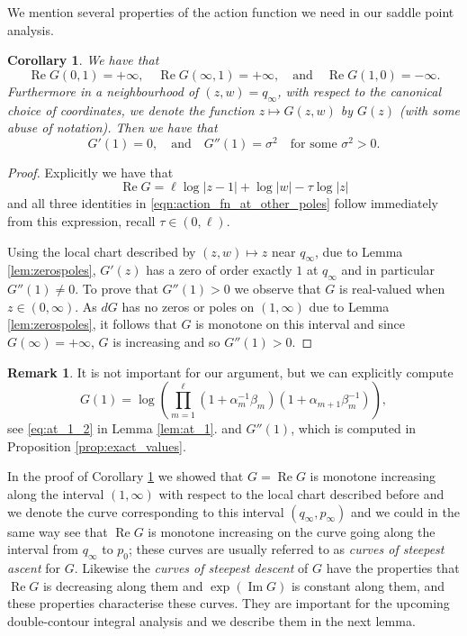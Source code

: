 \documentclass[11pt]{article}
\theoremstyle{plain}
\newtheorem{corollary}[theorem]{Corollary}
\theoremstyle{definition}
\newtheorem{remark}[theorem]{Remark}
\numberwithin{equation}{section}
\DeclareMathOperator{\im}{Im}
\DeclareMathOperator{\re}{Re}
\begin{document}
We mention several properties of the action function we need in our saddle point analysis.
\begin{corollary}%
 \label{lem:action_taylor}       
We have that
\begin{equation}\label{eqn:action_fn_at_other_poles}
\re G(0,1)=+\infty, \quad \re G(\infty,1)=+\infty, \quad\text{and} \quad \re G(1,0)= -\infty.
\end{equation}
Furthermore in a neighbourhood of $(z,w)=q_\infty$, with respect to the canonical choice of coordinates,
we denote the function $z\mapsto G(z,w)$ by $G(z)$ (with some abuse of notation). Then we have that
%
%
\begin{equation}
 G'(1)=0, \quad\text{and} \quad G''(1)=\sigma^2\quad \text{for some } \sigma^2>0.
\end{equation}
%
%
\end{corollary}

\begin{proof}
Explicitly we have that
$$\re G= \ell \log|z-1|+\log|w|-\tau \log |z|$$
and all three identities in \eqref{eqn:action_fn_at_other_poles} follow immediately from this expression, recall $\tau\in (0, \ell)$.


Using the local chart described by $(z,w)\mapsto z$ near $q_{\infty}$, due to Lemma \ref{lem:zerospoles}, $G'(z)$ has a zero of order exactly $1$ at $q_{\infty}$ and in particular $G''(1)\not=0$. 
To prove that $G''(1)>0$ we observe that $G$ is real-valued when $z\in(0,\infty)$. As $dG$ has no zeros or poles on $(1,\infty)$ due to Lemma \ref{lem:zerospoles}, it follows that $G$ is monotone on this interval and since $G(\infty)=+\infty$, $G$ is increasing and so $G''(1)>0$.
%
%
\end{proof}

\begin{remark}
%
It is not important for our argument, but we can explicitly compute 
$$G(1)=\log\left( \prod_{m=1}^\ell(1+\alpha_m^{-1}\beta_m)(1+\alpha_{m+1}\beta_m^{-1})\right),$$
see \eqref{eq:at_1_2} in Lemma \ref{lem:at_1}.
 and $G''(1)$, which is computed in Proposition \ref{prop:exact_values}.
\end{remark}
In the proof of Corollary \ref{lem:action_taylor} we showed that $G=\re G$ is monotone increasing along the interval $(1,\infty)$ with respect to the local chart described before and we denote the curve corresponding to this interval $(q_{\infty}, p_{\infty})$ and we could in the same way see that $\re G$ is monotone increasing on the curve going along the interval from $q_{\infty}$ to $p_0$; these curves are usually referred to as \textit{curves of steepest ascent} for $ G$. Likewise the \textit{curves of steepest descent} of $G$ have the properties that $\re G$ is decreasing along them and $\exp(\im G)$ is constant along them, and these properties characterise these curves. They are important for the upcoming double-contour integral analysis and we describe them in the next lemma. 
\end{document}
